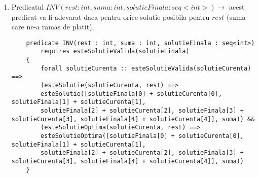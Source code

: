 \begin{enumerate}
\item Predicatul $  INV(rest : int, suma : int, solutieFinala : seq<int>) \rightarrow$ acest predicat va fi adevarat daca pentru orice solutie posibila pentru $rest$ (suma care ne-a ramas de platit), 
\begin{lstlisting}
	predicate INV(rest : int, suma : int, solutieFinala : seq<int>)
		requires esteSolutieValida(solutieFinala)
	{
		forall solutieCurenta :: esteSolutieValida(solutieCurenta) ==>
		(esteSolutie(solutieCurenta, rest) ==> 
		esteSolutie([solutieFinala[0] + solutieCurenta[0], solutieFinala[1] + solutieCurenta[1], 
		solutieFinala[2] + solutieCurenta[2], solutieFinala[3] + solutieCurenta[3], solutieFinala[4] + solutieCurenta[4]], suma)) &&
		(esteSolutieOptima(solutieCurenta, rest) ==> 
		esteSolutieOptima([solutieFinala[0] + solutieCurenta[0], solutieFinala[1] + solutieCurenta[1],
		solutieFinala[2] + solutieCurenta[2], solutieFinala[3] + solutieCurenta[3], solutieFinala[4] + solutieCurenta[4]], suma))
	}
\end{lstlisting}




\end{enumerate}




